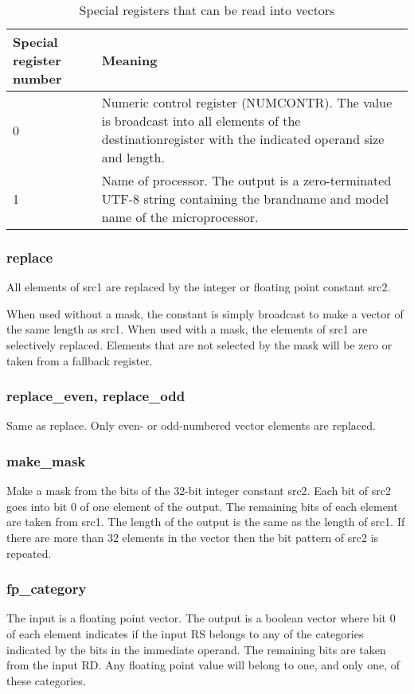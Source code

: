 \documentclass[forwardcom.tex]{subfiles}
\begin{document}
\begin{longtable} {|p{15mm}|p{100mm}|}
\caption{Special registers that can be read into vectors} 
\label{table:specialVectorRegisters} \\
\endfirsthead
\endhead
\hline
\bfseries Special register number & \bfseries Meaning  \\
\hline
0 & Numeric control register (NUMCONTR). The value is broadcast into all elements of the destinationregister with the indicated operand size and length.  \\
\hline
1 & Name of processor. The output is a zero-terminated UTF-8 string containing the brandname and model name of the microprocessor. \\
\hline
\end{longtable}

\subsubsection{replace}
All elements of src1 are replaced by the integer or floating point constant src2.
\vspace{2mm}

When used without a mask, the constant is simply broadcast to make a vector of the same length as src1. When used with a mask, the elements of src1 are selectively replaced. Elements that are not selected by the mask will be zero or taken from a fallback register.

\subsubsection{replace\_even, replace\_odd}
Same as replace. Only even- or odd-numbered vector elements are replaced.

\subsubsection{make\_mask}
Make a mask from the bits of the 32-bit integer constant src2. Each bit of src2 goes into bit 0 of one element of the output. The remaining bits of each element are taken from src1. The length of the output is the same as the length of src1. If there are more than 32 elements in the vector then the bit pattern of src2 is repeated.


\subsubsection{fp\_category}
The input is a floating point vector. The output is a boolean vector where bit 0 of each element indicates if the input RS belongs to any of the categories indicated by the bits in the immediate operand. The remaining bits are taken from the input RD. Any floating point value will belong to one, and only one, of these categories. 
\end{document}
